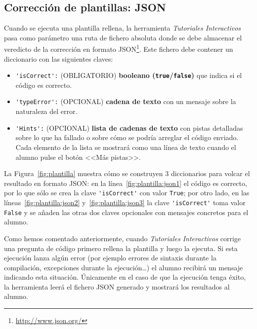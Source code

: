 \documentclass[]{article}
\newcommand{\code}[1]{{\lstinline[basicstyle=\ttfamily,mathescape]!#1!}}
\newcommand{\toolname}{\emph{Tutoriales Interactivos}}
\begin{document}
\subsection{Corrección de plantillas: JSON}
Cuando se ejecuta una plantilla rellena, la herramienta \toolname{} pasa como parámetro una ruta de fichero absoluta donde se debe almacenar el veredicto de la corrección en formato JSON\footnote{\url{http://www.json.org/}}. Este fichero debe contener un diccionario con las siguientes claves:
\begin{itemize}
	\item \code{'isCorrect':} {\sf (OBLIGATORIO)} \textbf{booleano (\code{true}/\code{false})} que indica si el código es correcto.
	\item \code{'typeError':} {\sf (OPCIONAL)} \textbf{cadena de texto} con un mensaje sobre la naturaleza del error. 
	\item \code{'Hints':} {\sf (OPCIONAL)} \textbf{lista de cadenas de texto} con pistas detalladas sobre lo que ha fallado o sobre cómo se podría arreglar el código enviado. Cada elemento de la lista se mostrará como una línea de texto cuando el alumno pulse el botón <<Más pistas>>.
\end{itemize}
La Figura~\ref{fig:plantilla} muestra cómo se construyen 3 diccionarios para volcar el resultado en formato JSON: en la línea~\ref{fig:plantilla:json1} el código es correcto, por lo que sólo se crea la clave \code{'isCorrect'} con valor \code{True}; por otro lado, en las líneas~\ref{fig:plantilla:json2} y~\ref{fig:plantilla:json3} la clave \code{'isCorrect'} toma valor \code{False} y se añaden las otras dos claves opcionales con mensajes concretos para el alumno.

Como hemos comentado anteriormente, cuando \toolname{} corrige una pregunta de código primero rellena la plantilla y luego la ejecuta. Si esta ejecución lanza algún error (por ejemplo errores de sintaxis durante la compilación, excepciones durante la ejecución\ldots) el alumno recibirá un mensaje indicando esta situación. Únicamente en el caso de que la ejecución tenga éxito, la herramienta leerá el fichero JSON generado y mostrará los resultados al alumno.
\end{document}
